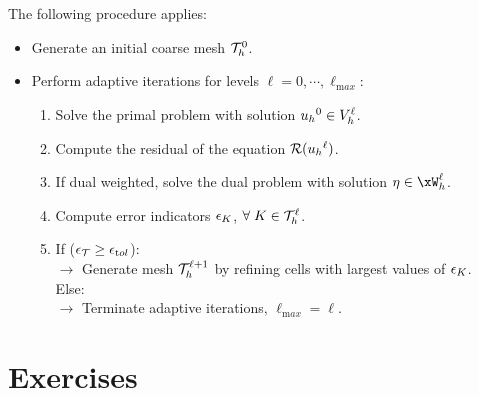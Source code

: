 \medskip
\begin{lgrthm} The following
procedure applies:
\begin{itemize}
\item Generate an initial coarse mesh ${\mathcal T}_h^0$.
\item Perform adaptive iterations for levels $\ell = 0, \cdots,\ell_{\mathrm max}$\;:
\begin{enumerate}
\item Solve the primal problem with solution ${u_h}^0 \in {{V}}_h^\ell$.
\item Compute the residual of the equation ${\mathcal{R}({u_h}^\ell)}$.
\item If dual weighted, solve the dual problem with solution $\eta \in \xW_h^\ell$.
\item Compute error indicators $\epsilon_K$, ${\forall\;} K \in {\mathcal T}_h^\ell$.
\item
If ($\epsilon_{\mathcal T} \geq \epsilon_{\mathrm tol}$)\;:\\
$\rightarrow$ Generate mesh ${\mathcal T}_h^{\ell+1}$ by refining cells with largest values of $\epsilon_K$.\\
Else\;:\\
$\rightarrow$ Terminate adaptive iterations, $\ell_{\mathrm max} = \ell$.
\end{enumerate}
\end{itemize}
\end{lgrthm}

\section{Exercises}

